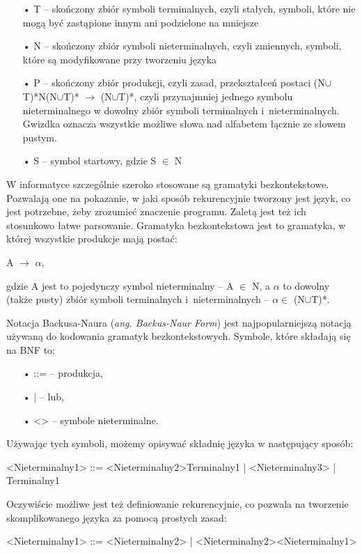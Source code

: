 \begin{itemize}
  \item[•] T -- skończony zbiór symboli terminalnych, czyli stałych, symboli, które nie mogą być zastąpione innym ani podzielone na mniejsze 
  \item[•] N -- skończony zbiór symboli nieterminalnych, czyli zmiennych, symboli, które są modyfikowane przy tworzeniu języka
  \item[•] P -- skończony zbiór produkcji, czyli zasad, przekształceń postaci (N$\cup$T)*N(N$\cup$T)* $\rightarrow$ (N$\cup$T)*, czyli przynajmniej jednego symbolu nieterminalnego w dowolny zbiór symboli terminalnych i~nieterminalnych. Gwizdka oznacza wszystkie możliwe słowa nad alfabetem łącznie ze słowem pustym.
  \item[•] S -- symbol startowy, gdzie S $\in$ N
\end{itemize}

W informatyce szczególnie szeroko stosowane są gramatyki bezkontekstowe. Pozwalają one na pokazanie, w jaki sposób rekurencyjnie tworzony jest język, co jest potrzebne, żeby zrozumieć znaczenie programu. Zaletą jest też ich stosunkowo łatwe parsowanie.
Gramatyka bezkontekstowa jest to gramatyka, w której wszystkie produkcje mają postać:
\begin{center}
	A $\rightarrow$ {$\alpha$},
\end{center}
gdzie A jest to pojedynczy symbol nieterminalny -- A $\in$ N, a $\alpha$ to dowolny (także pusty) zbiór symboli terminalnych i~nieterminalnych -- $\alpha \in$ (N$\cup$T)*.
	
Notacja Backusa-Naura (\textit{ang. Backus-Naur Form}) \cite{Backus1959TheSA, Naur, Knuth1964} jest najpopularniejszą notacją używaną do kodowania gramatyk bezkontekstowych. Symbole, które składają się na BNF to:

\begin{itemize}
  \item[•] ::= -- produkcja,
  \item[•] |   -- lub,
  \item[•] <>  -- symbole nieterminalne.
\end{itemize}

Używając tych symboli, możemy opisywać składnię języka w następujący sposób:
\begin{center}
<Nieterminalny1> ::= <Nieterminalny2>Terminalny1 | <Nieterminalny3> | Terminalny1
\end{center}
Oczywiście możliwe jest też definiowanie rekurencyjnie, co pozwala na tworzenie skomplikowanego języka za pomocą prostych zasad: 
\begin{center}
<Nieterminalny1> ::= <Nieterminalny2> | <Nieterminalny2><Nieterminalny1>
\end{center}

